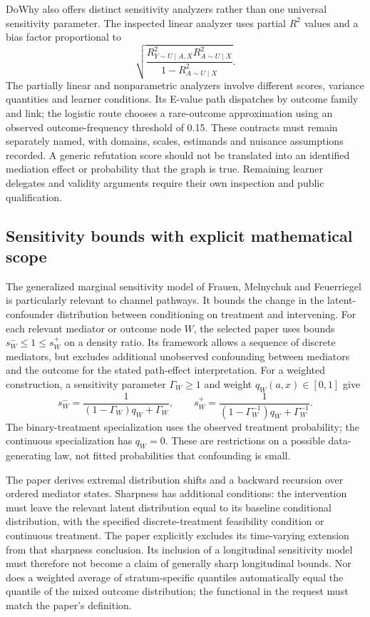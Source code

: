 DoWhy also offers distinct sensitivity analyzers rather than one universal sensitivity parameter. The inspected linear analyzer uses partial $R^2$ values and a bias factor proportional to
\[
 \sqrt{\frac{R^2_{Y\sim U\mid A,X}R^2_{A\sim U\mid X}}
 {1-R^2_{A\sim U\mid X}}}.
\]
The partially linear and nonparametric analyzers involve different scores, variance quantities and learner conditions. Its E-value path dispatches by outcome family and link; the logistic route chooses a rare-outcome approximation using an observed outcome-frequency threshold of 0.15. These contracts must remain separately named, with domains, scales, estimands and nuisance assumptions recorded. A generic refutation score should not be translated into an identified mediation effect or probability that the graph is true. Remaining learner delegates and validity arguments require their own inspection and public qualification.\cite{exec25_pymed_dowhy,exec25_pymed_choice}

\subsection{Sensitivity bounds with explicit mathematical scope}
The generalized marginal sensitivity model of Frauen, Melnychuk and Feuerriegel is particularly relevant to channel pathways. It bounds the change in the latent-confounder distribution between conditioning on treatment and intervening. For each relevant mediator or outcome node $W$, the selected paper uses bounds $s_W^-\leq1\leq s_W^+$ on a density ratio. Its framework allows a sequence of discrete mediators, but excludes additional unobserved confounding between mediators and the outcome for the stated path-effect interpretation. For a weighted construction, a sensitivity parameter $\Gamma_W\geq1$ and weight $q_W(a,x)\in[0,1]$ give
\[
 s_W^-=\frac{1}{(1-\Gamma_W)q_W+\Gamma_W},\qquad
 s_W^+=\frac{1}{(1-\Gamma_W^{-1})q_W+\Gamma_W^{-1}}.
\]
The binary-treatment specialization uses the observed treatment probability; the continuous specialization has $q_W=0$. These are restrictions on a possible data-generating law, not fitted probabilities that confounding is small.\cite{exec25_pymed_sharp_paper}

The paper derives extremal distribution shifts and a backward recursion over ordered mediator states. Sharpness has additional conditions: the intervention must leave the relevant latent distribution equal to its baseline conditional distribution, with the specified discrete-treatment feasibility condition or continuous treatment. The paper explicitly excludes its time-varying extension from that sharpness conclusion. Its inclusion of a longitudinal sensitivity model must therefore not become a claim of generally sharp longitudinal bounds. Nor does a weighted average of stratum-specific quantiles automatically equal the quantile of the mixed outcome distribution; the functional in the request must match the paper's definition.\cite{exec25_pymed_sharp_paper}


